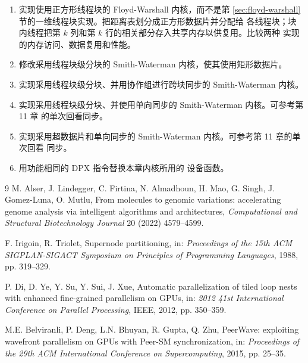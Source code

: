 \begin{enumerate}[label=\arabic*.,leftmargin=2.7em]
  \item 实现使用正方形线程块的 Floyd-Warshall 内核，而不是第
  \ref{sec:floyd-warshall} 节的一维线程块实现。把距离表划分成正方形数据片并分配给
  各线程块；块内线程把第 $k$ 列和第 $k$ 行的相关部分存入共享内存以供复用。比较两种
  实现的内存访问、数据复用和性能。
  \item 修改采用线程块级分块的 Smith-Waterman 内核，使其使用矩形数据片。
  \item 实现采用线程块级分块、并用协作组进行跨块同步的 Smith-Waterman 内核。
  \item 实现采用线程块级分块、并使用单向同步的 Smith-Waterman 内核。可参考第 11 章
  的单次回看同步。
  \item 实现采用超数据片和单向同步的 Smith-Waterman 内核。可参考第 11 章的单次回看
  同步。
  \item 用功能相同的 DPX 指令替换本章内核所用的  设备函数。
\end{enumerate}

\begin{chapterbibliography}{9}
  M. Alser, J. Lindegger, C. Firtina, N. Almadhoun, H. Mao, G. Singh,
  J. Gomez-Luna, O. Mutlu, From molecules to genomic variations: accelerating
  genome analysis via intelligent algorithms and architectures,
  \emph{Computational and Structural Biotechnology Journal} 20 (2022) 4579--4599.

  F. Irigoin, R. Triolet, Supernode partitioning, in: \emph{Proceedings of the
  15th ACM SIGPLAN-SIGACT Symposium on Principles of Programming Languages},
  1988, pp. 319--329.

  P. Di, D. Ye, Y. Su, Y. Sui, J. Xue, Automatic parallelization of tiled loop
  nests with enhanced fine-grained parallelism on GPUs, in: \emph{2012 41st
  International Conference on Parallel Processing}, IEEE, 2012, pp. 350--359.

  M.E. Belviranli, P. Deng, L.N. Bhuyan, R. Gupta, Q. Zhu, PeerWave: exploiting
  wavefront parallelism on GPUs with Peer-SM synchronization, in:
  \emph{Proceedings of the 29th ACM International Conference on Supercomputing},
  2015, pp. 25--35.
\end{chapterbibliography}
